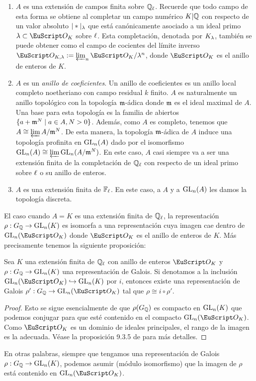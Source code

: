 \documentclass[../../tesis_maestria]{subfiles}
\begin{document}
\begin{enumerate}
\item $A$ es una extensi\'on de campos finita sobre $\mathbb{Q}_{\ell}$. Recuerde que todo campo de esta forma se obtiene al completar un campo num\'erico $K|\mathbb{Q}$ con respecto de un valor absoluto $|\ast|_{\lambda}$ que est\'a can\'onicamente asociado a un ideal primo $\la\subset\Oo_K$ sobre $\ell$. Esta completaci\'on, denotada por $K_{\lambda}$, tambi\'en se puede obtener como el campo de cocientes del l\'imite inverso $\Oo_{K,\la}:=\varprojlim_n \Oo_K/\la^n$, donde $\Oo_K$ es el anillo de enteros de $K$.
\item $A$ es un \emph{anillo de coeficientes}. Un anillo de coeficientes es un anillo local completo noetheriano con campo residual $k$ finito. $A$ es naturalmente un anillo topol\'ogico con la topolog\'ia $\mathfrak{m}$-\'adica donde $\mathfrak{m}$ es el ideal maximal de $A$. Una base para esta topolog\'ia es la familia de abiertos $\{a+\mathfrak{m}^N\mid a\in A, N>0\}$. Adem\'as, como $A$ es completo, tenemos que $A\cong\varprojlim A/\mathfrak{m}^N$. De esta manera, la topolog\'ia $\mathfrak{m}$-\'adica de $A$ induce una topolog\'ia profinita en $\mathrm{GL}_n(A)$ dado por el isomorfismo $\mathrm{GL}_n(A)\cong\varprojlim\mathrm{GL}_n(A/\mathfrak{m}^N)$. En este caso, $A$ casi siempre va a ser una extensi\'on finita de la completaci\'on de $\mathbb{Q}_{\ell}$ con respecto de un ideal primo sobre $\ell$ o su anillo de enteros.
\item $A$ es una extensi\'on finita de $\mathbb{F}_{\ell}$. En este caso, a $A$ y a $\mathrm{GL}_n(A)$ les damos la topolog\'ia discreta.
\end{enumerate}



El caso cuando $A=K$ es una extensi\'on finita de $\mathbb{Q}_{\ell}$, la representaci\'on $\rho:G_{\mathbb{Q}}\rightarrow\mathrm{GL}_n(K)$ es isomorfa a una representaci\'on cuya imagen cae dentro de $\GL_n(\Oo_K)$ donde $\Oo_K$ es el anillo de enteros de $K$. M\'as precisamente tenemos la siguiente proposici\'on:

\begin{prop}\label{prop:imagen_entera_rho}
  Sea $K$ una extensi\'on finita de $\mathbb{Q}_\ell$ con anillo de enteros $\Oo_K$ y $\rho:G_{\mathbb{Q}}\rightarrow\mathrm{GL}_n(K)$ una representaci\'on de Galois. Si denotamos a la inclusi\'on $\GL_n(\Oo_K)\hookrightarrow\GL_n(K)$ por $i$, entonces existe una representaci\'on de Galois $\rho':\GQ\ra\GL_n(\Oo_K)$ tal que $\rho\cong i\circ\rho'$. 
\end{prop}
\begin{proof}
  Esto se sigue esencialmente de que $\rho(G_{\mathbb{Q}})$ es compacto en $\mathrm{GL}_n(K)$ que podemos conjugar para que est\'e contenido en el compacto $\GL_n(\Oo_K)$. Como $\Oo_K$ es un dominio de ideales principales, el rango de la imagen es la adecuada. V\'ease la proposici\'on 9.3.5 de \cite{DiamondShurmanAFCIMF} para m\'as detalles.
\end{proof}
En otras palabras, siempre que tengamos una representaci\'on de Galois $\rho:G_{\mathbb{Q}}\rightarrow\mathrm{GL}_n(K)$, podemos asumir (m\'odulo isomorfismo) que la imagen de $\rho$ est\'a contenido en $\GL_n(\Oo_K)$.
\end{document}
